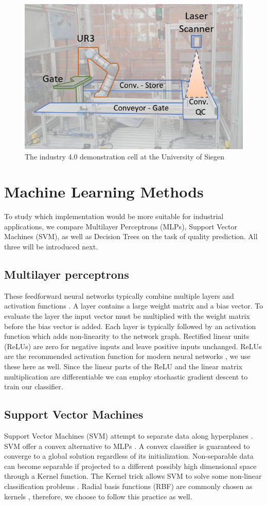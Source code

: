 \documentclass[5p,times,procedia]{elsarticle}
\begin{document}
\begin{figure}
       \includegraphics[width=.45\textwidth]{img/demozelle}
       \caption{The industry 4.0 demonstration cell at the University of Siegen}
\label{fig:ind_cell}
\end{figure}

\section{Machine Learning Methods} \label{sec:ML} %

To study which implementation would be more suitable for industrial applications, we compare Multilayer Perceptrons (MLPs), Support Vector Machines (SVM), as well as Decision Trees on the task of quality prediction. 
All three will be introduced next.

\subsection{Multilayer perceptrons}
These feedforward neural networks typically combine multiple layers
and activation functions \cite{bishop2006pattern}.
A layer contains a large weight matrix and
a bias vector. To evaluate the layer the input vector must be
multiplied with the weight matrix before the bias vector is added.
Each layer is typically followed by an activation function 
which adds non-linearity to the network graph. Rectified linear units
(ReLUs) are zero for negative inputs and leave positive inputs unchanged.
ReLUs are the recommended activation function for modern neural
networks \cite{goodfellow2016deep}, we use these here as well.
Since the linear parts of the ReLU and the linear matrix multiplication
are differentiable we can employ stochastic gradient
descent to train our classifier.

\subsection{Support Vector Machines}
Support Vector Machines (SVM) attempt to separate data
along hyperplanes \cite{aggarwal2015data}. 
SVM offer a convex alternative to MLPs \cite{Suykens2002least}.
A convex classifier is guaranteed to converge to a global solution
regardless of its initialization.
Non-separable data can become separable if projected to a different
possibly high dimensional space through a Kernel function.
The Kernel trick allows SVM to solve some non-linear
classification problems \cite{Suykens2002least}.
Radial basis functions (RBF) are commonly chosen as kernels
\cite{Suykens2002least}, therefore, we choose to follow this practice as well.
\end{document}
